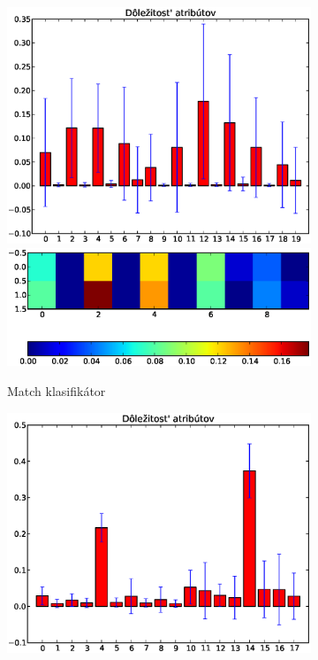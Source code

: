 \begin{figure}[htp]
        \centering
        \begin{subfigure}[t]{0.4\textwidth}
                \includegraphics[width=\textwidth]{images/clf_fi/randomforest5_bars}
                \includegraphics[width=\textwidth]{images/clf_fi/randomforest5_heatmap}
                \caption{Match klasifikátor}
                \label{fig:datatype1-m}
        \end{subfigure}%
        \qquad\qquad %
        \begin{subfigure}[t]{0.4\textwidth}
                \includegraphics[width=\textwidth]{images/clf_fi/randomforest5_indel_bars}

\end{subfigure}
\end{figure}
